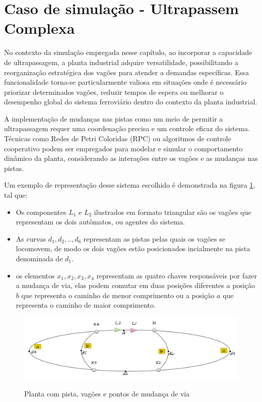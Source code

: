 \section{Caso de simulação - Ultrapassem Complexa}
No contexto da simulação empregada nesse capítulo, ao incorporar a capacidade de ultrapassagem, a planta industrial adquire versatilidade, possibilitando a reorganização estratégica dos vagões para atender a demandas específicas. Essa funcionalidade torna-se particularmente valiosa em situações onde é necessário priorizar determinados vagões, reduzir tempos de espera ou melhorar o desempenho global do sistema ferroviário dentro do contexto da planta industrial.

A implementação de mudanças nas pistas como um meio de permitir a ultrapassagem requer uma coordenação precisa e um controle eficaz do sistema. Técnicas como Redes de Petri Coloridas (RPC) ou algoritmos de controle cooperativo podem ser empregados para modelar e simular o comportamento dinâmico da planta, considerando as interações entre os vagões e as mudanças nas pistas.

Um exemplo de representação desse sistema escolhido é demonstrada na figura \ref{fig:pista_com_dois_agentes}, tal que:
\begin{itemize}
    \item Os componentes $L_1$ e $L_2$ ilustrados em formato triangular são os vagões que representam os dois autômatos, ou agentes do sistema.
    \item As curvas $d_1,d_2,..,d_6$ representam as pistas pelas quais os vagões se locomovem, de modo os dois vagões estão posicionados incialmente na pista denominada de $d_1$.
    \item os elementos $x_1,x_2,x_3,x_4$ representam as quatro chaves responsáveis por fazer a mudança de via, elas podem comutar em duas posições diferentes a posição $b$ que representa o caminho de menor comprimento ou a posição $a$ que representa o caminho de maior comprimento.
\end{itemize}

\begin{figure}[h]
\centering
\caption{Planta com pista, vagões e pontos de mudança de via }
\includegraphics[width=1\linewidth]{figures/Simulation/Planta/planta_dois_agentes.png}
\label{fig:pista_com_dois_agentes}
\end{figure}

